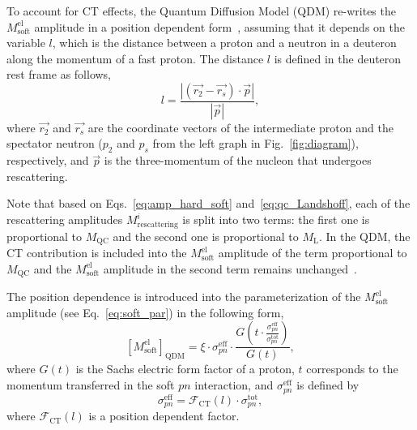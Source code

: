 To account for CT effects, the Quantum Diffusion Model (QDM) re-writes the $M_{\textrm{soft}}^{\textrm{el}}$ amplitude in a position dependent form~\cite{Farrar:1988me}, assuming that it depends on the variable $l$, which is the distance between a proton and a neutron in a deuteron along the momentum of a fast proton. The distance $l$ is defined in the deuteron rest frame as follows,\vspace{-0.3em} 
\begin{equation}
l = \frac{\left|\left(\overrightarrow{r_{2}} - \overrightarrow{r_{s}} \right)\cdot\overrightarrow{p}  \right|}{\left|\overrightarrow{p} \right|},\label{eq:l_distance}
\end{equation}
where $\overrightarrow{r_{2}}$ and $\overrightarrow{r_{s}}$ are the coordinate vectors of the intermediate proton and the spectator neutron ($p_{2}$ and $p_{s}$ from the left graph in Fig.~\ref{fig:diagram}), respectively, and $\overrightarrow{p}$ is the three-momentum of the nucleon that undergoes rescattering.

Note that based on Eqs.~\eqref{eq:amp_hard_soft} and~\eqref{eq:qc_Landshoff}, each of the rescattering amplitudes $M_{\textrm{rescattering}}^{i}$ is split into two terms: the ﬁrst one is proportional to $M_{\textrm{QC}}$ and the second one is proportional to $M_{\textrm{L}}$. In the QDM, the CT contribution is included into the $M_{\textrm{soft}}^{\textrm{el}}$ amplitude of the term proportional to $M_{\textrm{QC}}$ and the $M_{\textrm{soft}}^{\textrm{el}}$ amplitude in the second term remains unchanged~\cite{Farrar:1988me,Ralston:1988rb}. 

The position dependence is introduced into the parameterization of the $M_{\textrm{soft}}^{\textrm{el}}$ amplitude (see Eq.~\eqref{eq:soft_par}) in the following form,\vspace{-0.6em} 
\begin{equation}
\left [ M_{\textrm{soft}}^{\textrm{el}}\right ]_{\textrm{QDM}} =\xi \cdot \sigma_{pn}^{\textrm{eff}} \cdot \frac{G\left (t \cdot \frac{\sigma_{pn}^{\textrm{eff}}}{\sigma_{pn}^{\textrm{tot}}}  \right)}{G(t)},\label{eq:soft_par2}
\end{equation}
where $G(t)$ is the Sachs electric form factor of a proton, $t$ corresponds to the momentum transferred in the soft $pn$ interaction, and $\sigma_{pn}^{\textrm{eff}}$ is defined by \vspace{-0.3em} 
\begin{equation}
\sigma_{pn}^{\textrm{eff}} =\mathcal F_{\textrm{CT}}(l)\cdot \sigma_{pn}^{\textrm{tot}},\label{eq:soft_par3}
\end{equation}
where $\mathcal F_{\textrm{CT}}(l)$ is a position dependent factor.


